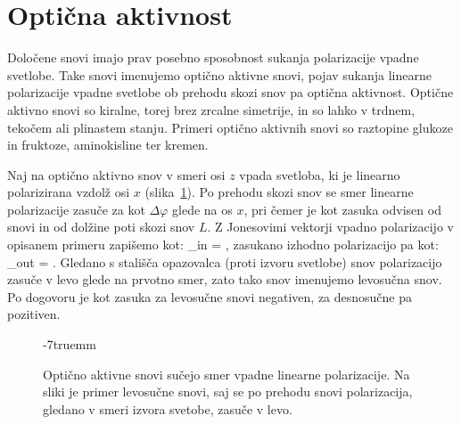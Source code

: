 \section{Optična aktivnost}
Določene snovi imajo prav posebno sposobnost sukanja polarizacije vpadne svetlobe.
Take snovi imenujemo optično aktivne snovi, pojav sukanja linearne polarizacije
vpadne svetlobe ob prehodu skozi snov pa optična aktivnost.
Optične aktivno snovi so kiralne, torej brez zrcalne simetrije, in so lahko
v trdnem, tekočem ali plinastem stanju. Primeri optično aktivnih snovi
so raztopine glukoze in fruktoze, aminokisline ter kremen.

Naj na optično aktivno snov v smeri osi $z$ 
vpada svetloba, ki je linearno polarizirana vzdolž osi $x$ 
(slika~\ref{fig:09_aktivnost}). Po 
prehodu skozi snov se smer linearne polarizacije
zasuče za kot $\Delta \varphi$ glede na os $x$, pri čemer je kot zasuka 
odvisen od snovi in od dolžine poti skozi snov $L$. Z Jonesovimi
vektorji vpadno polarizacijo v opisanem primeru zapišemo kot:
\beq
{}_{in} = 
\left[\begin{array}{c}
1\\
0\\
\end{array}\right]\!\!,
\label{eq:09_40}
\eeq
zasukano izhodno polarizacijo pa kot:
\beq
{}_{out} = 
\!\!.
\label{eq:09_41}
\eeq
Gledano s stališča opazovalca (proti izvoru svetlobe)
snov polarizacijo zasuče v levo glede na prvotno smer, zato tako snov imenujemo
levosučna snov. Po dogovoru je kot zasuka za levosučne snovi negativen, za
desnosučne pa pozitiven.
\begin{figure}[h]
\centering
\def\svgwidth{100truemm} 

\caption{Optično aktivne snovi sučejo smer vpadne linearne polarizacije. Na sliki
je primer levosučne snovi, saj se po prehodu snovi polarizacija, gledano v smeri 
izvora svetobe, zasuče v levo.}
\label{fig:09_aktivnost}
\vglue-7truemm
\end{figure}
 
